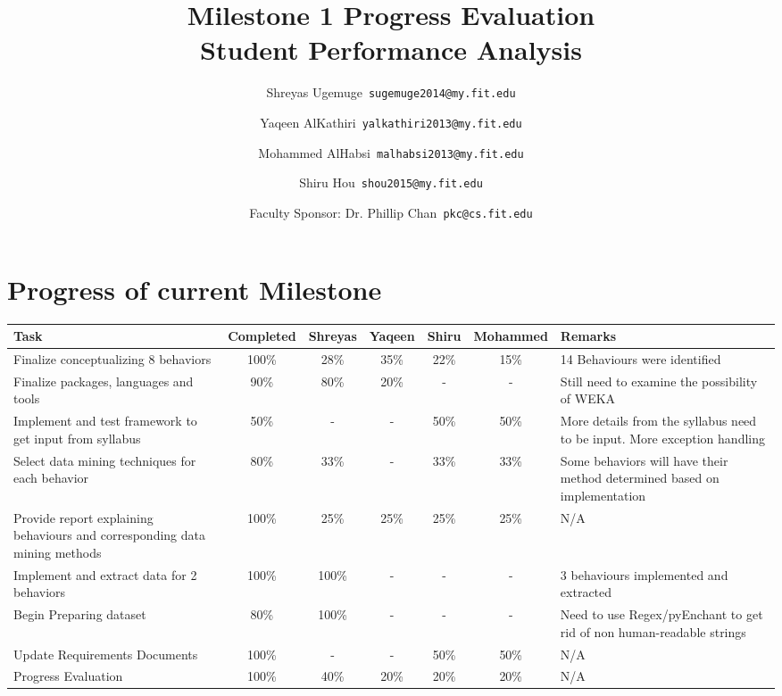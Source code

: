 \documentclass[12pt]{article}
\begin{document}
	\title{\textbf{Milestone 1 Progress Evaluation} \\ \hfill \break
	Student Performance Analysis}
	\author{Shreyas Ugemuge\      \texttt{sugemuge2014@my.fit.edu}
  \and
  Yaqeen AlKathiri\      \texttt{yalkathiri2013@my.fit.edu}
  \and
	Mohammed AlHabsi\      \texttt{malhabsi2013@my.fit.edu}
  \and
  Shiru Hou\      \texttt{shou2015@my.fit.edu}
  \and
  Faculty Sponsor: Dr. Phillip Chan\      \texttt{pkc@cs.fit.edu}}
	\maketitle
	\pagebreak
	\singlespacing
	\tableofcontents
	\pagebreak
	\section{Progress of current Milestone}
	\begin{adjustbox}{totalheight=\baselineskip}
	\begin{tabularx}{\textwidth}{|X|c|c|c|c|c|X|}
	\hline
		\textbf{Task} & \textbf{Completed} &\textbf{Shreyas} & \textbf{Yaqeen} & \textbf{Shiru} & \textbf{Mohammed} & \textbf{Remarks}  \\
		\hline
		Finalize conceptualizing 8 behaviors & 100\% & 28\% & 35\% & 22\% & 15\% & 14 Behaviours were identified \\ \hline
		Finalize packages, languages and tools & 90\% & 80\% & 20\% & - & - & Still need to examine the possibility of WEKA \\ \hline
		Implement and test framework to get input from syllabus & 50\% & - & - & 50\% & 50\% & More details from the syllabus need to be input. More exception handling\\ \hline
		Select data mining techniques for each behavior & 80\% & 33\% & - & 33\% & 33\% & Some behaviors will have their method determined based on implementation\\ \hline
		Provide report explaining behaviours and corresponding data mining methods & 100\% &25\% & 25\% & 25\% & 25\% & N/A\\ \hline
		Implement and extract data for 2 behaviors & 100\% &100\% & - & - & - & 3 behaviours implemented and extracted\\ \hline
		Begin Preparing dataset & 80\% & 100\% & - & - & - & Need to use Regex/pyEnchant to get rid of non human-readable strings \\  \hline
		Update Requirements Documents & 100\% & - & - & 50\% & 50\% & N/A \\ \hline
		Progress Evaluation & 100\% & 40\% & 20\% & 20\% & 20\% & N/A \\ \hline 
	\end{tabularx}
	\end{adjustbox}
\end{document}

